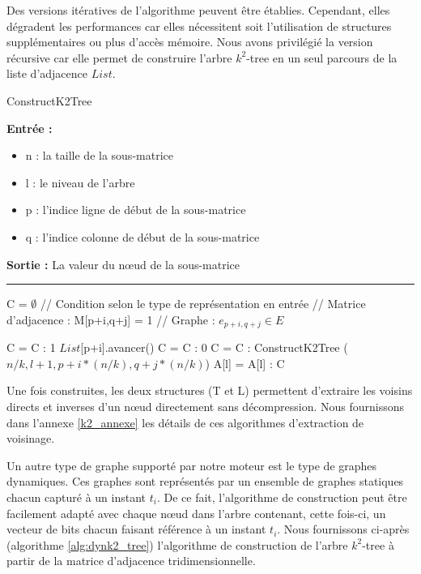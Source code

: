 \documentclass[a4paper,oneside,12pt]{report}
\theoremstyle{definition}
\begin{document}
Des versions itératives de l'algorithme peuvent être établies. Cependant, elles dégradent les performances car elles nécessitent soit l'utilisation de structures supplémentaires ou plus d'accès mémoire. Nous avons privilégié la version récursive car elle permet de construire l'arbre $k^2$-tree en un seul parcours de la liste d'adjacence $List$.\\

					\begin{algorithm}[H]
					\label{alg:k2_tree}
					\caption{ConstructK2Tree}
					\textbf{Entrée :}
						\begin{itemize}[label=$\bullet$]
							\item n : la taille de la sous-matrice
							\item l : le niveau de l'arbre
							\item p : l'indice ligne de début de la sous-matrice
							\item q : l'indice colonne de début de la sous-matrice
						\end{itemize}
					\textbf{Sortie :} La valeur du nœud de la sous-matrice\\							\noindent\rule{\textwidth}{1pt}
						
						
				\begin{algorithmic} [1]
					\STATE C = $ \emptyset$
								\STATE // Condition selon le type de représentation en entrée 
								\STATE // Matrice d'adjacence : M[p+i,q+j] = 1 
								\STATE // Graphe : $e_{p+i,q+j} \in E$
								
									\STATE C = C : 1
									\STATE $List$[p+i].avancer()
								\ELSE
									\STATE C = C : 0
								\ENDIF
							\ELSE
								\STATE  C = C : ConstructK2Tree ( $n/k,l+1,p+i*(n/k), q+j*(n/k)$)
							\ENDIF
						\ENDFOR
					\ENDFOR
					\ENDIF
					\STATE A[l] = A[l] : C
				\end{algorithmic}
			\end{algorithm}
	
	
		Une fois construites, les deux structures (T et L) permettent d'extraire les voisins directs et inverses d'un nœud directement sans décompression. Nous fournissons dans l'annexe \ref{k2_annexe} les détails de ces  algorithmes d'extraction de voisinage.		
			
	

	Un autre type de graphe supporté par notre moteur est le type de graphes dynamiques. Ces graphes sont représentés par un ensemble de graphes statiques chacun capturé à un instant $t_i$. De ce fait, l'algorithme de construction peut être facilement adapté avec chaque nœud dans l'arbre contenant, cette fois-ci, un vecteur de bits chacun faisant référence à un instant $t_i$. Nous fournissons ci-après (algorithme \ref{alg:dynk2_tree}) l'algorithme de construction de l'arbre $k^2$-tree à partir de la matrice d'adjacence tridimensionnelle.\\
	
\end{document}
